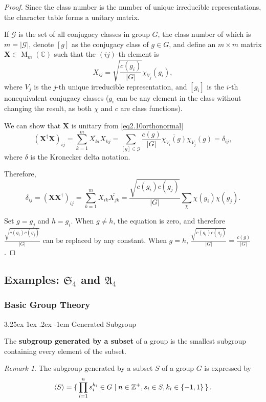 \documentclass[12pt, letterpaper]{article}
\makeatletter
\newcommand{\inte}{\mathbb{Z}}
\newcommand{\co}{\mathbb{C}}
\newcommand{\MM}{\operatorname{M}}
\newcommand{\card}[1]{\left\lvert #1 \right\rvert}
\newcommand{\hadj}[1]{{#1}^{\dagger}}
\newcommand{\conj}{\overline}
\newcommand{\ec}[1]{\left[{#1}\right]}
\newcommand{\gensub}[1]{\left\langle{#1}\right\rangle}
\renewcommand\paragraph{\@startsection{paragraph}{4}{\z@}%
	{3.25ex \@plus1ex \@minus.2ex}%
	{-1em}%
	{\normalfont\normalsize\bfseries}}
\theoremstyle{definition}
\theoremstyle{remark}
\newtheorem*{rem*}{Remark}
\theoremstyle{definition}
\theoremstyle{plain}
\numberwithin{equation}{section}
\makeatother
\begin{document}
	\begin{proof}
		Since the class number is the number of unique irreducible representations,
		the character table forms a unitary matrix.
		
		If $\mathcal{G}$ is the set of all conjugacy classes
		in group $G$,
		the class number of which is $m=\card{\mathcal{G}}$,
		denote $\ec{g}$ as the conjugacy class of $g\in G$,
		and
		define an $m\times m$ matrix $\mathbf{X}\in \MM_m(\co)$
		such that the $(ij)$-th element
		is
		\[X_{ij}=\sqrt{\frac{c(g_i)}{\card{G}}}\chi_{V_j}(g_i),\]
		where $V_j$ is the $j$-th unique irreducible representation,
		and $\ec{g_i}$ is the $i$-th nonequivalent conjugacy classes
		($g_i$ can be any element in the class without changing the result,
		as both $\chi$ and $c$ are class functions).
		
		We can show that $\mathbf{X}$ is unitary from \eqref{eq2.10orthonormal}
		\begin{equation}
			(\hadj{\mathbf{X}}\mathbf{X})_{ij}=\sum_{k=1}^{m}\conj{X_{ki}}X_{kj} =\sum_{\ec{g}\in\mathcal{G}} \frac{c(g)}{\card{G}}\conj{\chi_{V_i}(g)}\chi_{V_j}(g)=\delta_{ij},
		\end{equation}
		where $\delta$ is the Kronecker delta notation.
		
		Therefore,
		\begin{equation}
			\delta_{ij}=(\mathbf{X}\hadj{\mathbf{X}})_{ij}=\sum_{k=1}^{m}X_{ik}\conj{X_{jk}}=
			\frac{\sqrt{c(g_i)c(g_j)}}{\card{G}}\sum_{\chi}\chi(g_i)\conj{\chi(g_j)}.
		\end{equation}
	
		Set $g=g_j$ and $h=g_i$. When $g\ne h$, the equation is zero,
		and therefore $\frac{\sqrt{c(g_i)c(g_j)}}{\card{G}}$
		can be replaced by any constant.
		When $g=h$, $\frac{\sqrt{c(g_i)c(g_j)}}{\card{G}}=\frac{c(g)}{\card{G}}$.
	\end{proof}
	
	\subsection{Examples: $\mathfrak{S}_4$ and $\mathfrak{A}_4$}
	
	\subsubsection{Basic Group Theory}
	\paragraph{Generated Subgroup}
	\begin{def*}
		The \textbf{subgroup generated by a subset} of a group is the smallest subgroup containing every element of the subset.
	\end{def*}
	\begin{rem*}
		The subgroup generated by a subset $S$ of a group $G$ is expressed by
		\[\gensub{S} = \set{\prod_{i=1}^{n}s_i^{k_i}\in G|n\in \inte^+,s_i\in S, k_i\in\{-1,1\}}.\]
	\end{rem*}
\end{document}
